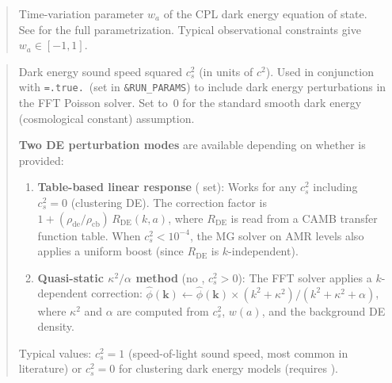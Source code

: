 \label{param:wa}

\begin{quote}
Time-variation parameter $w_a$ of the CPL dark energy equation of
state.  See  for the full parametrization.  Typical
observational constraints give $w_a \in [-1, 1]$.
\end{quote}

\label{param:cs2_de}

\begin{quote}
Dark energy sound speed squared $c_s^2$ (in units of $c^2$).  Used
in conjunction with \texttt{=.true.}\ (set in
\texttt{\&RUN\_PARAMS}) to include dark energy perturbations in the
FFT Poisson solver.  Set to~0 for the standard smooth dark energy
(cosmological constant) assumption.

\textbf{Two DE perturbation modes} are available depending on whether
 is provided:

\begin{enumerate}[nosep]
  \item \textbf{Table-based linear response} ( set):
    Works for any $c_s^2$ including $c_s^2 = 0$ (clustering DE).
    The correction factor is
    $1 + (\rho_{\mathrm{de}}/\rho_{\mathrm{cb}})\,R_{\mathrm{DE}}(k,a)$,
    where $R_{\mathrm{DE}}$ is read from a CAMB transfer function table.
    When $c_s^2 < 10^{-4}$, the MG solver on AMR levels also applies
    a uniform boost (since $R_{\mathrm{DE}}$ is $k$-independent).

  \item \textbf{Quasi-static $\kappa^2/\alpha$ method} (no , $c_s^2 > 0$):
    The FFT solver applies a $k$-dependent correction:
    $\hat\phi(\mathbf{k}) \leftarrow \hat\phi(\mathbf{k}) \times
    (k^2 + \kappa^2)/(k^2 + \kappa^2 + \alpha)$,
    where $\kappa^2$ and $\alpha$ are computed from $c_s^2$, $w(a)$, and
    the background DE density.
\end{enumerate}

Typical values: $c_s^2 = 1$ (speed-of-light sound speed, most common
in literature) or $c_s^2 = 0$ for clustering dark energy models
(requires ).

\end{quote}

